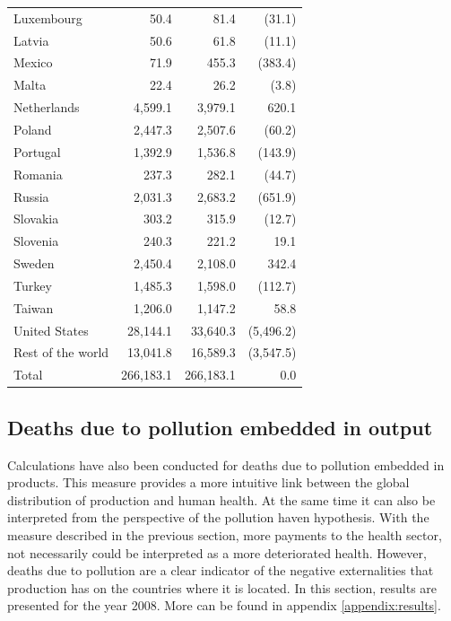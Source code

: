 \documentclass[a4paper,12pt, ]{article}
\begin{document}
\begin{table}
\begin{center}
\begin{tabular}{lrrr}
Luxembourg &  50.4  &  81.4  & (31.1)\\ 
Latvia &  50.6  &  61.8  & (11.1)\\ 
Mexico &  71.9  &  455.3  & (383.4)\\ 
Malta &  22.4  &  26.2  & (3.8)\\ 
Netherlands &  4,599.1  &  3,979.1  & 620.1 \\ 
Poland &  2,447.3  &  2,507.6  & (60.2)\\ 
Portugal &  1,392.9  &  1,536.8  & (143.9)\\ 
Romania &  237.3  &  282.1  & (44.7)\\ 
Russia &  2,031.3  &  2,683.2  & (651.9)\\ 
Slovakia &  303.2  &  315.9  & (12.7)\\ 
Slovenia &  240.3  &  221.2  & 19.1 \\ 
Sweden &  2,450.4  &  2,108.0  & 342.4 \\ 
Turkey &  1,485.3  &  1,598.0  & (112.7)\\ 
Taiwan &  1,206.0  &  1,147.2  & 58.8 \\ 
United States &  28,144.1  &  33,640.3  & (5,496.2)\\ 
Rest of the world &  13,041.8  &  16,589.3  & (3,547.5)\\ 
\hline
Total &  266,183.1  &  266,183.1  & 0.0 \\
\hline
\end{tabular}
\label{tab03} 
\end{center}
\end{table}

\subsection{Deaths due to pollution embedded in output}

Calculations have also been conducted for deaths due to pollution embedded in products. This measure provides a more intuitive link between the global distribution of production and human health. At the same time it can also be interpreted from the perspective of the pollution haven hypothesis. With the measure described in the previous section, more payments to the health sector, not necessarily could be interpreted as a more deteriorated health. However, deaths due to pollution are a clear indicator of the negative externalities that production has on the countries where it is located. In this section, results are presented for the year 2008. More can be found in appendix \ref{appendix:results}.
\end{document}
